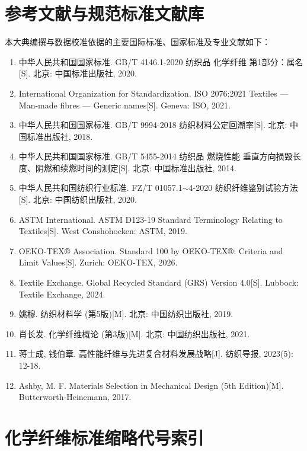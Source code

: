 \documentclass[11pt,openright,twoside,UTF8]{ctexbook}
\begin{document}
\backmatter

\chapter{参考文献与规范标准文献库}

本大典编撰与数据校准依据的主要国际标准、国家标准及专业文献如下：

\begin{enumerate} \small \setlength{\itemsep}{3pt}
    \item 中华人民共和国国家标准. GB/T 4146.1-2020 纺织品 化学纤维 第1部分：属名[S]. 北京: 中国标准出版社, 2020.
    \item International Organization for Standardization. ISO 2076:2021 Textiles --- Man-made fibres --- Generic names[S]. Geneva: ISO, 2021.
    \item 中华人民共和国国家标准. GB/T 9994-2018 纺织材料公定回潮率[S]. 北京: 中国标准出版社, 2018.
    \item 中华人民共和国国家标准. GB/T 5455-2014 纺织品 燃烧性能 垂直方向损毁长度、阴燃和续燃时间的测定[S]. 北京: 中国标准出版社, 2014.
    \item 中华人民共和国纺织行业标准. FZ/T 01057.1$\sim$4-2020 纺织纤维鉴别试验方法[S]. 北京: 中国纺织出版社, 2020.
    \item ASTM International. ASTM D123-19 Standard Terminology Relating to Textiles[S]. West Conshohocken: ASTM, 2019.
    \item OEKO-TEX® Association. Standard 100 by OEKO-TEX®: Criteria and Limit Values[S]. Zurich: OEKO-TEX, 2026.
    \item Textile Exchange. Global Recycled Standard (GRS) Version 4.0[S]. Lubbock: Textile Exchange, 2024.
    \item 姚穆. 纺织材料学 (第5版)[M]. 北京: 中国纺织出版社, 2019.
    \item 肖长发. 化学纤维概论 (第3版)[M]. 北京: 中国纺织出版社, 2021.
    \item 蒋士成, 钱伯章. 高性能纤维与先进复合材料发展战略[J]. 纺织导报, 2023(5): 12-18.
    \item Ashby, M. F. Materials Selection in Mechanical Design (5th Edition)[M]. Butterworth-Heinemann, 2017.
\end{enumerate}

\chapter{化学纤维标准缩略代号索引}
\end{document}
